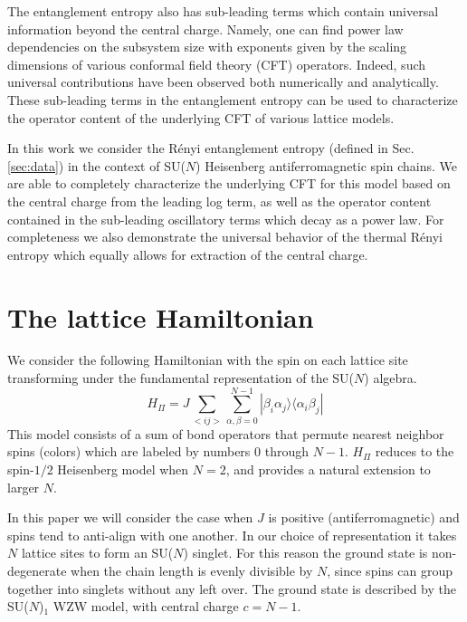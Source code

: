 \documentclass[aps,prb,reprint,floatfix]{revtex4-1}
\begin{document}
The entanglement entropy also has sub-leading terms which contain universal information beyond the central charge. Namely, one can find power law dependencies on the subsystem size with exponents given by the scaling dimensions of various conformal field theory (CFT) operators.\cite{Cardy2010:Unusual}  Indeed, such universal contributions have been observed both numerically\cite{laflorencie2006boundary,Calabrese2010:ParityEffects} and analytically.\cite{Fagotti2011:UniversalParity}  These sub-leading terms in the entanglement entropy can be used to characterize the operator content of the underlying CFT of various lattice models.  

In this work we consider the R\'{e}nyi entanglement entropy (defined in Sec. \ref{sec:data})  in the context of SU($N$) Heisenberg antiferromagnetic spin chains. We are able to completely characterize the underlying CFT for this model based on the central charge from the leading log term, as well as the operator content contained in the sub-leading oscillatory terms which decay as a power law.  For completeness we also demonstrate the universal behavior of the thermal R\'{e}nyi entropy which equally allows for extraction of the central charge.

\section{The lattice Hamiltonian} 


We consider the following Hamiltonian with the spin on each lattice site transforming under the fundamental representation of the SU($N$) algebra.  
{\allowdisplaybreaks
\begin{equation}
		H_{\Pi} = J\sum_{<ij>}\sum^{N-1}_{\alpha ,\beta =0} |\beta_{i}\alpha_{j}\rangle\langle\alpha_{i}\beta_{j}|
\label{eq:PermutationHamiltonian}
\end{equation}}
This model consists of a sum of bond operators that permute nearest neighbor spins (colors) which are labeled by numbers 0 through $N-1$. $H_\Pi$ reduces to the spin-$1/2$ Heisenberg model when $N=2$, and provides a natural extension to larger $N$.  

In this paper we will consider the case when $J$ is positive (antiferromagnetic) and spins tend to anti-align with one another.  In our choice of representation it takes $N$ lattice sites to form an SU($N$) singlet.  For this reason the ground state is non-degenerate when the chain length is evenly divisible by $N$, since spins can group together into singlets without any left over.  The ground state is described by the SU($N$)$_{1}$ WZW model, with central charge $c=N-1$. \cite{Affleck1986:CriticalExpSUN,Affleck1988:CriticalSUN}
\end{document}
